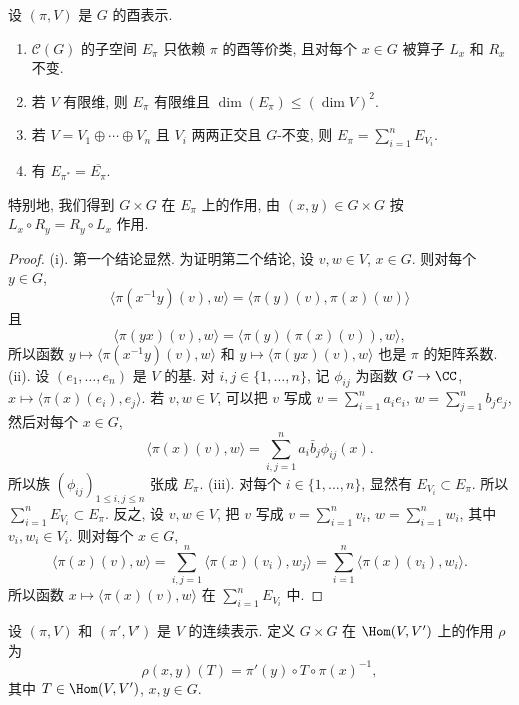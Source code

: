 \begin{proposition}[矩阵系数的基本性质]
\label{prop:IV.3.2}
设 $(\pi, V)$ 是 $G$ 的酉表示.
\begin{enumerate}
\item[(i)] $\mathcal{C}(G)$ 的子空间 $E_{\pi}$ 只依赖 $\pi$ 的酉等价类, 且对每个 $x \in G$ 被算子 $L_x$ 和 $R_x$ 不变.
\item[(ii)] 若 $V$ 有限维, 则 $E_{\pi}$ 有限维且 $\dim(E_{\pi}) \leq (\dim V)^2$.
\item[(iii)] 若 $V = V_1 \oplus \cdots \oplus V_n$ 且 $V_i$ 两两正交且 $G$-不变, 则 $E_{\pi} = \sum_{i=1}^n E_{V_i}$.
\item[(iv)] 有 $E_{\pi^*} = \overline{E_{\pi}}$.
\end{enumerate}
特别地, 我们得到 $G \times G$ 在 $E_{\pi}$ 上的作用, 由 $(x, y) \in G \times G$ 按 $L_x \circ R_y = R_y \circ L_x$ 作用.
\end{proposition}

\begin{proof}
(i). 第一个结论显然. 为证明第二个结论, 设 $v, w \in V$, $x \in G$. 则对每个 $y \in G$,
\[
\langle \pi(x^{-1}y)(v), w \rangle = \langle \pi(y)(v), \pi(x)(w) \rangle
\]
且
\[
\langle \pi(yx)(v), w \rangle = \langle \pi(y)(\pi(x)(v)), w \rangle,
\]
所以函数 $y \longmapsto \langle \pi(x^{-1}y)(v), w \rangle$ 和 $y \longmapsto \langle \pi(yx)(v), w \rangle$ 也是 $\pi$ 的矩阵系数.
(ii). 设 $(e_1, \ldots, e_n)$ 是 $V$ 的基. 对 $i, j \in \{1, \ldots, n\}$, 记 $\phi_{ij}$ 为函数 $G \to \CC$, $x \longmapsto \langle \pi(x)(e_i), e_j \rangle$. 若 $v, w \in V$, 可以把 $v$ 写成 $v = \sum_{i=1}^n a_ie_i$, $w = \sum_{j=1}^n b_je_j$, 然后对每个 $x \in G$,
\[
\langle \pi(x)(v), w \rangle = \sum_{i,j=1}^n a_i\bar{b}_j\phi_{ij}(x).
\]
所以族 $(\phi_{ij})_{1 \leq i,j \leq n}$ 张成 $E_{\pi}$.
(iii). 对每个 $i \in \{1, \ldots, n\}$, 显然有 $E_{V_i} \subset E_{\pi}$. 所以 $\sum_{i=1}^n E_{V_i} \subset E_{\pi}$. 反之, 设 $v, w \in V$, 把 $v$ 写成 $v = \sum_{i=1}^n v_i$, $w = \sum_{i=1}^n w_i$, 其中 $v_i, w_i \in V_i$. 则对每个 $x \in G$,
\[
\langle \pi(x)(v), w \rangle = \sum_{i,j=1}^n\langle \pi(x)(v_i), w_j \rangle = \sum_{i=1}^n\langle \pi(x)(v_i), w_i \rangle.
\]
所以函数 $x \longmapsto \langle \pi(x)(v), w \rangle$ 在 $\sum_{i=1}^n E_{V_i}$ 中.
\end{proof}

\begin{definition}
\label{def:IV.3.3}
设 $(\pi, V)$ 和 $(\pi', V')$ 是 $V$ 的连续表示. 定义 $G \times G$ 在 $\Hom(V, V')$ 上的作用 $\rho$ 为
\[
\rho(x, y)(T) = \pi'(y) \circ T \circ \pi(x)^{-1},
\]
其中 $T \in \Hom(V, V')$, $x, y \in G$.
\end{definition}

